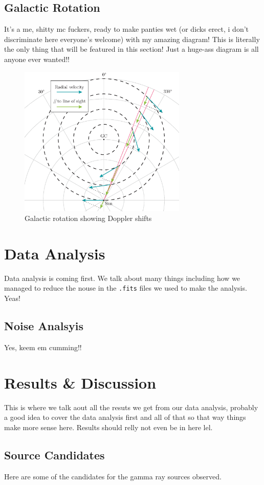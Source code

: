 \documentclass[a4paper, titlepage, oneside]{article}
\begin{document}
\begin{multicols}{2}
\subsection{Galactic Rotation}
It's a me, shitty mc fuckers, ready to make panties wet (or dicks erect, i don't discriminate here everyone's welcome) with my amazing diagram! This is literally the only thing that will be featured in this section! Just a huge-ass diagram is all anyone ever wanted!!

\begin{figure}[H]
\centering
\includegraphics[width=8cm]{figures/galactic-rotation}
\caption{Galactic rotation showing Doppler shifts}
\label{fig:gal-rot}
\end{figure}

\section{Data Analysis}
Data analysis is coming first. We talk about many things including how we managed to reduce the nouse in the \texttt{.fits} files we used to make the analysis. Yeas!

\subsection{Noise Analsyis}
Yes, keem em cumming!!

\section{Results \& Discussion}
This is where we talk aout all the resuts we get from our data analysis, probably a good idea to cover the data analysis first and all of that so that way things make more sense here. Results should relly not even be in here lel.

\subsection{Source Candidates}
Here are some of the candidates for the gamma ray sources observed.


\end{multicols}
\end{document}
